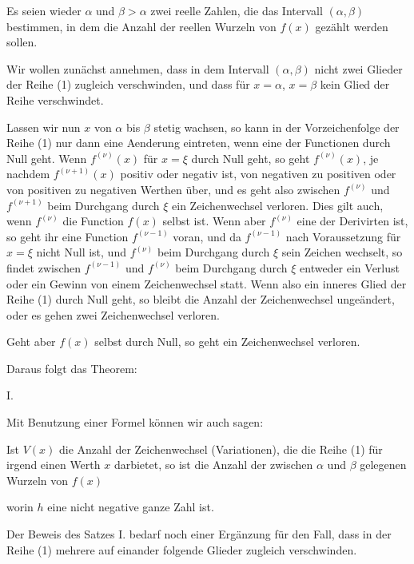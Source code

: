 
Es seien wieder $\alpha$ und $\beta > \alpha$ zwei reelle Zahlen, die das Intervall $(\alpha, \beta)$ bestimmen, in dem die Anzahl der reellen Wurzeln von $f(x)$ gezählt werden sollen.

Wir wollen zunächst annehmen, dass in dem Intervall $(\alpha, \beta)$ nicht zwei Glieder der Reihe (1) zugleich verschwinden, und dass für $x = \alpha$, $x = \beta$ kein Glied der Reihe verschwindet.

Lassen wir nun $x$ von $\alpha$ bis $\beta$ stetig wachsen, so kann in der Vorzeichenfolge der Reihe (1) nur dann eine Aenderung eintreten, wenn eine der Functionen durch Null geht. Wenn $f^{(\nu)}(x)$ für $x = \xi$ durch Null geht, so geht $f^{(\nu)}(x)$, je nachdem $f^{(\nu+1)}(x)$ positiv oder negativ ist, von negativen zu positiven oder von positiven zu negativen Werthen über, und es geht also zwischen $f^{(\nu)}$ und $f^{(\nu+1)}$ beim Durchgang durch $\xi$ ein Zeichenwechsel verloren. Dies gilt auch, wenn $f^{(\nu)}$ die Function $f(x)$ selbst ist. Wenn aber $f^{(\nu)}$ eine der Derivirten ist, so geht ihr eine Function $f^{(\nu-1)}$ voran, und da $f^{(\nu-1)}$ nach Voraussetzung für $x = \xi$ nicht Null ist, und $f^{(\nu)}$ beim Durchgang durch $\xi$ sein Zeichen wechselt, so findet zwischen $f^{(\nu-1)}$ und $f^{(\nu)}$ beim Durchgang durch $\xi$ entweder ein Verlust oder ein Gewinn von einem Zeichenwechsel statt. Wenn also ein inneres Glied der Reihe (1) durch Null geht, so bleibt die Anzahl der Zeichenwechsel ungeändert, oder es gehen zwei Zeichenwechsel verloren.

Geht aber $f(x)$ selbst durch Null, so geht ein Zeichenwechsel verloren.

Daraus folgt das Theorem:

I. 

Mit Benutzung einer Formel können wir auch sagen:

Ist $V(x)$ die Anzahl der Zeichenwechsel (Variationen), die die Reihe (1) für irgend einen Werth $x$ darbietet, so ist die Anzahl der zwischen $\alpha$ und $\beta$ gelegenen Wurzeln von $f(x)$


worin $h$ eine nicht negative ganze Zahl ist.

Der Beweis des Satzes I. bedarf noch einer Ergänzung für den Fall, dass in der Reihe (1) mehrere auf einander folgende Glieder zugleich verschwinden.
